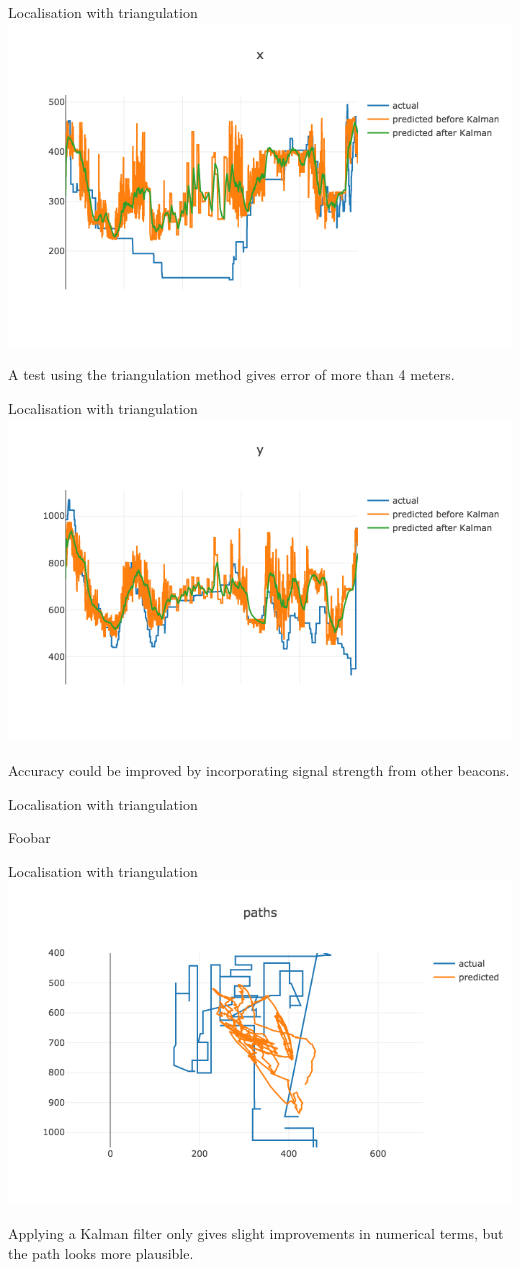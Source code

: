 \documentclass[landscape]{infslides}
\begin{document}
\begin{slide}{Localisation with triangulation}
    \centering
\includegraphics[width=0.6\linewidth]{images/trilateration_x.png}

A test using the triangulation method gives error of more than 4 meters.
\end{slide}

\begin{slide}{Localisation with triangulation}
    \centering
\includegraphics[width=0.6\linewidth]{images/trilateration_y.png}

Accuracy could be improved by incorporating signal strength from other beacons.
\end{slide}

\begin{slide}{Localisation with triangulation}

Foobar
\end{slide}

\begin{slide}{Localisation with triangulation}
    \centering
\includegraphics[width=0.6\linewidth]{images/trilateration_path.png}

Applying a Kalman filter only gives slight improvements in numerical terms, but the path looks more plausible.
\end{slide}
\end{document}
